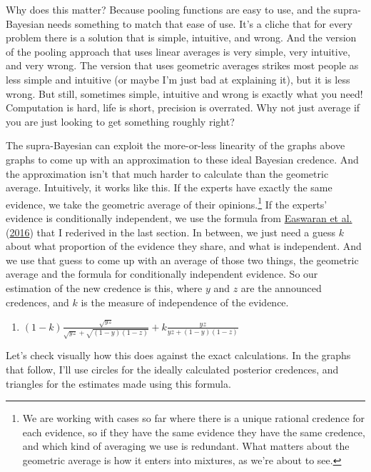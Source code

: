 \documentclass[
  12pt,
]{article}
\providecommand{\tightlist}{%
  \setlength{\itemsep}{0pt}\setlength{\parskip}{0pt}}
\begin{document}
Why does this matter? Because pooling functions are easy to use, and the
supra-Bayesian needs something to match that ease of use. It's a cliche
that for every problem there is a solution that is simple, intuitive,
and wrong. And the version of the pooling approach that uses linear
averages is very simple, very intuitive, and very wrong. The version
that uses geometric averages strikes most people as less simple and
intuitive (or maybe I'm just bad at explaining it), but it is less
wrong. But still, sometimes simple, intuitive and wrong is exactly what
you need! Computation is hard, life is short, precision is overrated.
Why not just average if you are just looking to get something roughly
right?

The supra-Bayesian can exploit the more-or-less linearity of the graphs
above graphs to come up with an approximation to these ideal Bayesian
credence. And the approximation isn't that much harder to calculate than
the geometric average. Intuitively, it works like this. If the experts
have exactly the same evidence, we take the geometric average of their
opinions.\footnote{We are working with cases so far where there is a
  unique rational credence for each evidence, so if they have the same
  evidence they have the same credence, and which kind of averaging we
  use is redundant. What matters about the geometric average is how it
  enters into mixtures, as we're about to see.} If the experts' evidence
is conditionally independent, we use the formula from
\protect\hyperlink{ref-EaswaranEtAl2016}{Easwaran et al.}
(\protect\hyperlink{ref-EaswaranEtAl2016}{2016}) that I rederived in the
last section. In between, we just need a guess \(k\) about what
proportion of the evidence they share, and what is independent. And we
use that guess to come up with an average of those two things, the
geometric average and the formula for conditionally independent
evidence. So our estimation of the new credence is this, where \(y\) and
\(z\) are the announced credences, and \(k\) is the measure of
independence of the evidence.

\begin{enumerate}
\def\labelenumi{(\arabic{enumi})}
\setcounter{enumi}{8}
\tightlist
\item
  \((1-k)\frac{\sqrt{yz}}{\sqrt{yz} + \sqrt{(1-y)(1-z)}} + k\frac{yz}{yz + (1-y)(1-z)}\)
\end{enumerate}

Let's check visually how this does against the exact calculations. In
the graphs that follow, I'll use circles for the ideally calculated
posterior credences, and triangles for the estimates made using this
formula.
\end{document}
